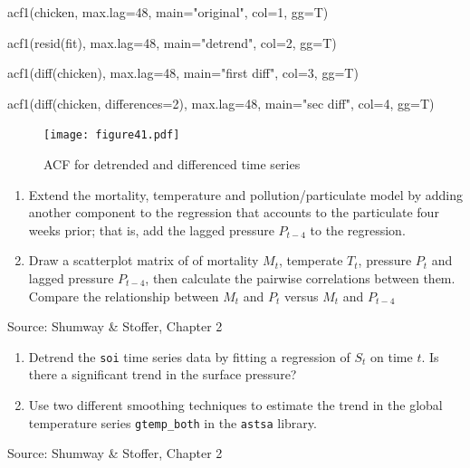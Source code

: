 \begin{Rcode}
acf1(chicken, max.lag=48, main="original", col=1, gg=T)

acf1(resid(fit), max.lag=48, main="detrend", col=2, gg=T)

acf1(diff(chicken), max.lag=48, 
    main="first diff", col=3, gg=T)

acf1(diff(chicken, differences=2), max.lag=48, 
    main="sec diff", col=4, gg=T)
\end{Rcode}

\begin{figure}
\centering
\texttt{[image: figure41.pdf]}
\caption{ACF for detrended and differenced time series}
\label{fig:figure41}
\end{figure}

\begin{exercisebox}
\begin{enumerate}
  \item Extend the mortality, temperature and pollution/particulate model by adding another component to the regression that accounts to the particulate four weeks prior; that is, add the lagged pressure $P_{t-4}$ to the regression.
  \item Draw a scatterplot matrix of of mortality $M_t$, temperate $T_t$, pressure $P_t$ and lagged pressure $P_{t-4}$, then calculate the pairwise correlations between them. Compare the relationship between $M_t$ and $P_t$ versus $M_t$ and $P_{t-4}$
\end{enumerate}

{\footnotesize \vspace{\baselineskip} Source: Shumway \& Stoffer, Chapter 2}
\end{exercisebox}

\begin{exercisebox}

\begin{enumerate}
  \item Detrend the \texttt{soi} time series data by fitting a regression of $S_t$ on time $t$. Is there a significant trend in the surface pressure?
  \item Use two different smoothing techniques to estimate the trend in the global temperature series \texttt{gtemp\_both} in the \texttt{astsa} library.
\end{enumerate}

{\footnotesize \vspace{\baselineskip} Source: Shumway \& Stoffer, Chapter 2}
\end{exercisebox}

